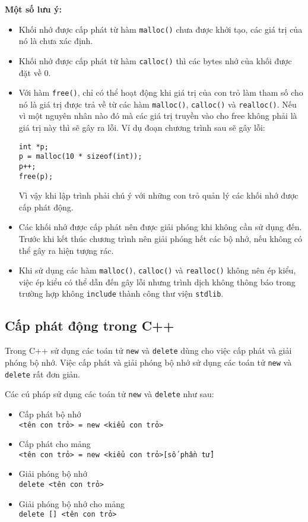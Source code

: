 \documentclass{article}
\begin{document}
\textbf{Một số lưu ý: }
\begin{itemize}
\item Khối nhớ được cấp phát từ hàm \texttt{malloc()} chưa được khởi tạo, các giá trị của nó là chưa xác định.
\item Khối nhớ được cấp phát từ hàm \texttt{calloc()} thì các bytes nhớ của khối được đặt về 0.
\item Với hàm \texttt{free()}, chỉ có thể hoạt động khi giá trị của con trỏ làm tham số cho nó là giá trị được trả về từ các hàm \texttt{malloc()}, \texttt{calloc()} và \texttt{realloc()}. Nếu vì một nguyên nhân nào đó mà các giá trị truyền vào cho free không phải là giá trị này thì sẽ gây ra lỗi. Ví dụ đoạn chương trình sau sẽ gây lỗi:

\begin{verbatim}
int *p;
p = malloc(10 * sizeof(int));
p++;
free(p);
\end{verbatim}

Vì vậy khi lập trình phải chú ý với những con trỏ quản lý các khối nhớ được cấp phát động.
\item Các khối nhớ được cấp phát nên được giải phóng khi không cần sử dụng đến. Trước khi kết thúc chương trình nên giải phóng hết các bộ nhớ, nếu không có thể gây ra hiện tượng rác.

\item Khi sử dụng các hàm \texttt{malloc()}, \texttt{calloc()} và \texttt{realloc()} không nên ép kiểu, việc ép kiểu có thể dẫn đến gây lỗi nhưng trình dịch không thông báo trong trường hợp không \texttt{include} thành công thư viện \texttt{stdlib}.
\end{itemize}
\newpage
\subsection{Cấp phát động trong C++}
Trong C++ sử dụng các toán tử \texttt{new} và \texttt{delete} dùng cho việc cấp phát và giải phóng bộ nhớ. Việc cấp phát và giải phóng bộ nhớ sử dụng các toán tử \texttt{new} và \texttt{delete} rất đơn giản.

Các cú pháp sử dụng các toán tử \texttt{new} và \texttt{delete} như sau:
\begin{itemize}
\item Cấp phát bộ nhớ \\ \texttt{<tên con trỏ> = new <kiểu con trỏ>}
\item Cấp phát cho mảng\\ \texttt{<tên con trỏ> = new <kiểu con trỏ>[số phần tử]}
\item Giải phóng bộ nhớ\\ \texttt{delete <tên con trỏ>}
\item Giải phóng bộ nhớ cho mảng\\ \texttt{delete [] <tên con trỏ>}
\end{itemize}
\end{document}

